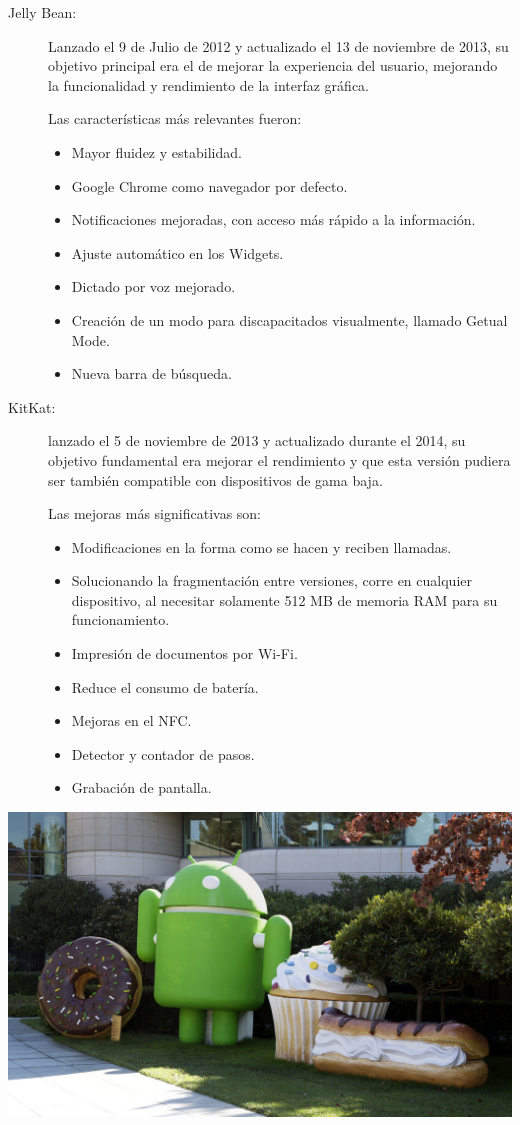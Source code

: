 \begin{description}
	\item[Jelly Bean:]
		 Lanzado el 9 de Julio de 2012 y actualizado el 13 de noviembre de 2013, su objetivo principal era el de mejorar la experiencia del usuario, mejorando la funcionalidad y 
		 rendimiento de la interfaz gráfica.
 
		 Las características más relevantes fueron:
		 \begin{itemize}
		 	\item Mayor fluidez y estabilidad.
		 	\item Google Chrome como navegador por defecto.
		 	\item Notificaciones mejoradas, con acceso más rápido a la información.
		 	\item Ajuste automático en los Widgets.
		 	\item Dictado por voz mejorado.
		 	\item Creación de un modo para discapacitados visualmente, llamado Getual Mode.
		 	\item Nueva barra de búsqueda.
		 \end{itemize}
	
	\item[KitKat:]
		lanzado el 5 de noviembre de 2013 y actualizado durante el 2014, su objetivo fundamental era mejorar el rendimiento y que esta versión pudiera ser también compatible con 
		dispositivos de gama baja.  
 
		Las mejoras más significativas son:
		\begin{itemize}
			\item Modificaciones en la forma como se hacen y reciben llamadas.
			\item Solucionando la fragmentación entre versiones, corre en cualquier dispositivo, al necesitar solamente 512 MB de memoria RAM para su funcionamiento.
			\item Impresión de documentos por Wi-Fi.
			\item Reduce el consumo de batería.
			\item Mejoras en el NFC.
			\item Detector y contador de pasos.
			\item Grabación de pantalla.
		\end{itemize}
\end{description}

\includegraphics[scale=0.3]{img/cp05/img0504.png}


